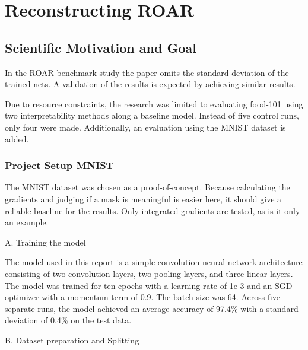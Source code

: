 
\chapter{Reconstructing ROAR} %
\label{sec:project}


\section{Scientific Motivation and Goal}
In the ROAR benchmark study \cite{hooker2019benchmark} the paper omits the standard deviation of the trained nets. A validation of the results is expected by achieving similar results.

Due to resource constraints, the research was limited to evaluating food-101 \cite{bossard14} using two interpretability methods along a baseline model. Instead of five control runs, only four were made. Additionally, an evaluation using the MNIST dataset is added.

\subsection{Project Setup MNIST}


The MNIST dataset \cite{deng2012mnist} was chosen as a proof-of-concept. Because calculating the gradients and judging if a mask is meaningful is easier here, it should give a reliable baseline for the results. Only integrated gradients are tested, as is it only an example.

A. Training the model

The model used in this report is a simple convolution neural network architecture consisting of two convolution layers, two pooling layers, and three linear layers. The model was trained for ten epochs with a learning rate of 1e-3 and an SGD optimizer with a momentum term of 0.9. The batch size was 64. Across five separate runs, the model achieved an average accuracy of 97.4\% with a standard deviation of 0.4\% on the test data.

B. Dataset preparation and Splitting



